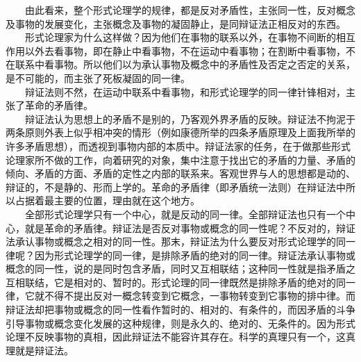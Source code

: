 \documentclass[cn,11pt,chinese]{elegantbook}
\begin{document}
　　由此看来，整个形式论理学的规律，都是反对矛盾性，主张同一性，反对概念及事物的发展变化，主张概念及事物的凝固静止，是同辩证法正相反对的东西。\\
　　形式论理家为什么这样做？因为他们在事物的联系以外，在事物不间断的相互作用以外去看事物，即在静止中看事物，不在运动中看事物；在割断中看事物，不在联系中看事物。所以他们以为承认事物及概念中的矛盾性及否定之否定的关系，是不可能的，而主张了死板凝固的同一律。\\
　　辩证法则不然，在运动中联系中看事物，和形式论理学的同一律针锋相对，主张了革命的矛盾律。\\
　　辩证法认为思想上的矛盾不是别的，乃客观外界矛盾的反映。辩证法不拘泥于两条原则外表上似乎相冲突的情形（例如康德所举的四条矛盾原理及上面我所举的许多矛盾思想），而透视到事物内部的本质中。辩证法家的任务，在于做那些形式论理家所不做的工作，向着研究的对象，集中注意于找出它的矛盾的力量、矛盾的倾向、矛盾的方面、矛盾的定性之内部的联系来。客观世界与人的思想都是动的、辩证的，不是静的、形而上学的。革命的矛盾律（即矛盾统一法则）在辩证法中所以占据着最主要的位置，理由就在这个地方。\\
　　全部形式论理学只有一个中心，就是反动的同一律。全部辩证法也只有一个中心，就是革命的矛盾律。辩证法是否反对事物或概念的同一性呢？不反对的，辩证法承认事物或概念之相对的同一性。那末，辩证法为什么要反对形式论理学的同一律呢？因为形式论理学的同一律，是排除矛盾的绝对的同一律。辩证法承认事物或概念的同一性，说的是同时包含矛盾，同时又互相联结；这种同一性就是指矛盾之互相联结，它是相对的、暂时的。形式论理的同一律既然是排除矛盾的绝对的同一律，它就不得不提出反对一概念转变到它概念，一事物转变到它事物的排中律。而辩证法却把事物或概念的同一性看作暂时的、相对的、有条件的，而因矛盾的斗争引导事物或概念变化发展的这种规律，则是永久的、绝对的、无条件的。因为形式论理不反映事物的真相，因此辩证法不能容许其存在。科学的真理只有一个，这真理就是辩证法。\\
\end{document}
